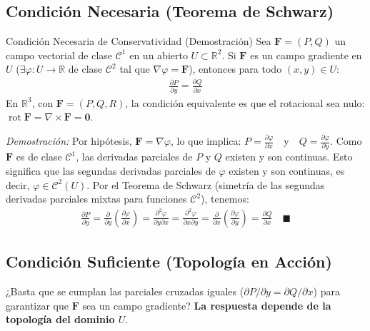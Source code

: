 \documentclass[11pt,a4paper]{article}
\begin{document}
\subsection{Condición Necesaria (Teorema de Schwarz)}

\begin{teoremabox}{Condición Necesaria de Conservatividad (Demostración)}
Sea $\mathbf{F} = (P, Q)$ un campo vectorial de clase $\mathcal{C}^1$ en un abierto $U \subset \mathbb{R}^2$. Si $\mathbf{F}$ es un campo gradiente en $U$ ($\exists \varphi: U \to \mathbb{R}$ de clase $\mathcal{C}^2$ tal que $\nabla \varphi = \mathbf{F}$), entonces para todo $(x,y) \in U$:
\begin{align*}
\frac{\partial P}{\partial y} = \frac{\partial Q}{\partial x}
\end{align*}
En $\mathbb{R}^3$, con $\mathbf{F}=(P,Q,R)$, la condición equivalente es que el rotacional sea nulo: $\operatorname{rot} \mathbf{F} = \nabla \times \mathbf{F} = \mathbf{0}$.

\textit{Demostración:}
Por hipótesis, $\mathbf{F} = \nabla \varphi$, lo que implica:
$P = \frac{\partial \varphi}{\partial x} \quad \text{y} \quad Q = \frac{\partial \varphi}{\partial y}$.
Como $\mathbf{F}$ es de clase $\mathcal{C}^1$, las derivadas parciales de $P$ y $Q$ existen y son continuas. Esto significa que las segundas derivadas parciales de $\varphi$ existen y son continuas, es decir, $\varphi \in \mathcal{C}^2(U)$.
Por el Teorema de Schwarz (simetría de las segundas derivadas parciales mixtas para funciones $\mathcal{C}^2$), tenemos:
\begin{align*}
\frac{\partial P}{\partial y} = \frac{\partial}{\partial y} \left( \frac{\partial \varphi}{\partial x} \right) = \frac{\partial^2 \varphi}{\partial y \partial x} = \frac{\partial^2 \varphi}{\partial x \partial y} = \frac{\partial}{\partial x} \left( \frac{\partial \varphi}{\partial y} \right) = \frac{\partial Q}{\partial x} \quad \blacksquare
\end{align*}
\end{teoremabox}

\subsection{Condición Suficiente (Topología en Acción)}

¿Basta que se cumplan las parciales cruzadas iguales ($\partial P/\partial y = \partial Q/\partial x$) para garantizar que $\mathbf{F}$ sea un campo gradiente? \textbf{La respuesta depende de la topología del dominio $U$}.
\end{document}
